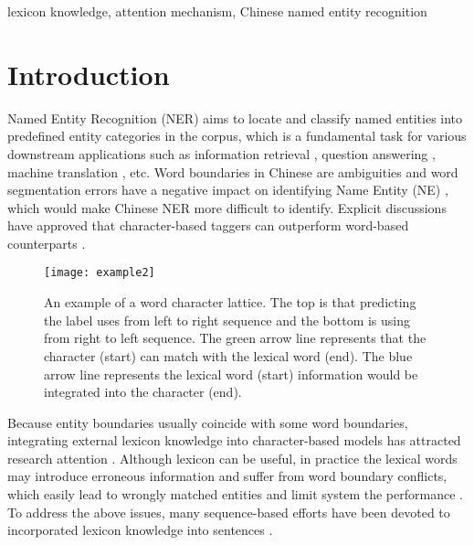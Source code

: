 \documentclass[conference]{IEEEtran}
\begin{document}
\begin{IEEEkeywords}
lexicon knowledge,  attention mechanism, Chinese named entity recognition
\end{IEEEkeywords}



\section{Introduction}

Named Entity Recognition (NER) aims to locate and classify named entities into predefined entity categories in the corpus,
which is a fundamental task for various downstream applications 
 such as information retrieval \cite{guo2009named},
question answering \cite{diefenbach2018core}, machine translation \cite{dandapat2016improved}, etc.
Word boundaries in Chinese are ambiguities and word segmentation errors 
have a negative impact on identifying Name Entity (NE) \cite{peng2015named},
which would make Chinese NER more difficult to identify. 
Explicit discussions have approved that character-based taggers can outperform word-based counterparts \cite{zhang2018chinese}.





\begin{figure}
    \centerline{\texttt{[image: example2]}}
\caption{An example of a word character lattice. 
    The top is that predicting the label uses from left to right sequence and 
    the bottom is using from right to left sequence. 
    The green arrow line represents 
    that the character (start) can match with the lexical word (end).
    The blue arrow line represents the lexical word (start) information would be integrated into the character (end).
    } \label{example}
    \end{figure}
    

Because entity boundaries usually coincide with some word boundaries,
integrating external lexicon knowledge into character-based models
has attracted research attention \cite{zhang2018chinese}. Although lexicon can be useful, in practice the lexical words may introduce
erroneous information and suffer from word boundary conflicts, which easily lead to wrongly matched entities
and limit system the performance \cite{chiu2016named}.
To address the above issues, many sequence-based efforts have been devoted to incorporated lexicon knowledge into sentences
  \cite{gui2019cnn,liu2019encoding}.
\end{document}
